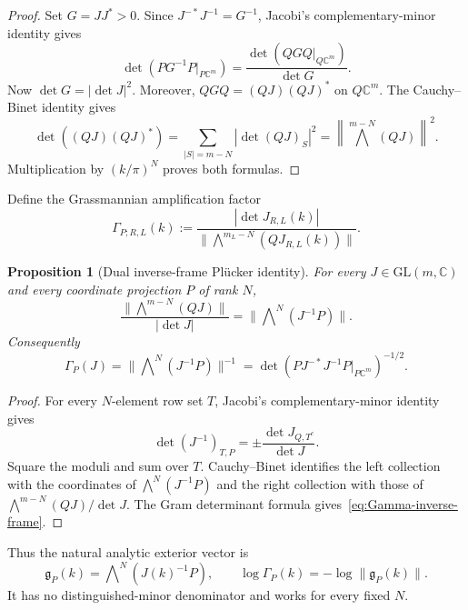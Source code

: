\documentclass[11pt]{article}
\newcommand{\C}{\mathbb C}
\newcommand{\wedgeN}{\bigwedge\nolimits^N}
\newtheorem{proposition}[theorem]{Proposition}
\theoremstyle{definition}
\theoremstyle{remark}
\begin{document}
\begin{proof}
Set $G=JJ^*>0$.  Since $J^{-*}J^{-1}=G^{-1}$, Jacobi's complementary-minor identity gives
\begin{equation}
 \det\!\left(PG^{-1}P\big|_{P\C^m}\right)
 =\frac{\det\!\left(QGQ\big|_{Q\C^m}\right)}{\det G}.
 \label{eq:jacobi-proof}
\end{equation}
Now $\det G=|\det J|^2$.  Moreover, $QGQ=(QJ)(QJ)^*$ on $Q\C^m$.  The Cauchy--Binet identity gives
\begin{equation}
 \det((QJ)(QJ)^*)
 =\sum_{|S|=m-N}|\det (QJ)_S|^2
 =\left\|\bigwedge^{m-N}(QJ)\right\|^2.
\end{equation}
Multiplication by $(k/\pi)^N$ proves both formulas.
\end{proof}

Define the Grassmannian amplification factor
\begin{equation}
 \Gamma_{P;R,L}(k)
 :=\frac{|\det J_{R,L}(k)|}
 {\|\bigwedge^{m_L-N}(QJ_{R,L}(k))\|}.
 \label{eq:Gamma}
\end{equation}

\begin{proposition}[Dual inverse-frame Pl\"ucker identity]\label{prop:dual-plucker}
For every $J\in\mathrm{GL}(m,\C)$ and every coordinate projection $P$ of
rank $N$,
\begin{equation}
 \frac{\|\bigwedge^{m-N}(QJ)\|}{|\det J|}
 =\|\wedgeN(J^{-1}P)\|.
 \label{eq:dual-plucker}
\end{equation}
Consequently
\begin{equation}
 \Gamma_P(J)
 =\|\wedgeN(J^{-1}P)\|^{-1}
 =\det\!\left(PJ^{-*}J^{-1}P\big|_{P\C^m}\right)^{-1/2}.
 \label{eq:Gamma-inverse-frame}
\end{equation}
\end{proposition}

\begin{proof}
For every $N$-element row set $T$, Jacobi's complementary-minor identity gives
\begin{equation}
 \det(J^{-1})_{T,P}
 =\pm\frac{\det J_{Q,T^c}}{\det J}.
\end{equation}
Square the moduli and sum over $T$.  Cauchy--Binet identifies the left
collection with the coordinates of $\wedgeN(J^{-1}P)$ and the right
collection with those of $\bigwedge^{m-N}(QJ)/\det J$.  The Gram determinant
formula gives~\eqref{eq:Gamma-inverse-frame}.
\end{proof}

Thus the natural analytic exterior vector is
\begin{equation}
 \mathfrak g_P(k)=\wedgeN\!\left(J(k)^{-1}P\right),
 \qquad
 \log\Gamma_P(k)=-\log\|\mathfrak g_P(k)\|.
 \label{eq:dual-exterior-frame}
\end{equation}
It has no distinguished-minor denominator and works for every fixed $N$.
\end{document}
